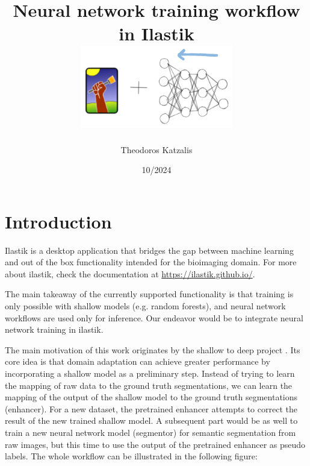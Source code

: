 \documentclass[12pt, a4paper]{article}
\begin{document}
\title{
Neural network training workflow in Ilastik\\[1cm]

\includegraphics[width=0.5\textwidth]{ilastik-logo.png}
}

\author{Theodoros Katzalis}


\date{10/2024}


\sloppy
\maketitle

{
\hypersetup{linkcolor=black}
\tableofcontents
}

\clearpage

\section{Introduction}

Ilastik is a desktop application that bridges the gap between machine learning and out of the box functionality intended for the bioimaging domain. For more about ilastik, check the documentation at \url{https://ilastik.github.io/}.

The main takeaway of the currently supported functionality is that training is only possible with shallow models (e.g. random forests), and neural network workflows are used only for inference. Our endeavor would be to integrate neural network training in ilastik.

The main motivation of this work originates by the shallow to deep project \cite{Matskevych2021.11.09.467925}. Its core idea is that domain adaptation can achieve greater performance by incorporating a shallow model as a preliminary step. Instead of trying to learn the mapping of raw data to the ground truth segmentations, we can learn the mapping of the output of the shallow model to the ground truth segmentations (enhancer). For a new dataset, the pretrained enhancer attempts to correct the result of the new trained shallow model. A subsequent part would be as well to train a new neural network model (segmentor) for semantic segmentation from raw images, but this time to use the output of the pretrained enhancer as pseudo labels. The whole workflow can be illustrated in the following figure:
\end{document}

